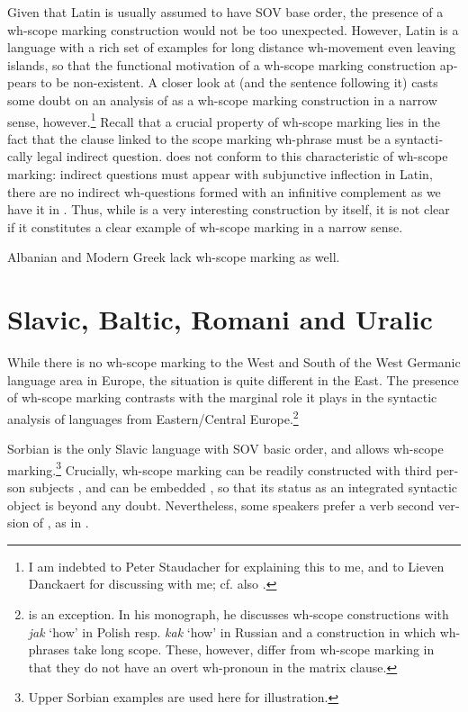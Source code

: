 \documentclass[output=paper,colorlinks,citecolor=brown]{langscibook}
\begin{document}
\begin{otherlanguage}{english}
\noindent Given that Latin is usually assumed to have SOV base order, the presence of a wh-scope marking construction would not be too unexpected. However, Latin is a language with a rich set of examples for long distance wh-movement even leaving islands, so that the functional motivation of a wh-scope marking construction appears to be non-existent. A closer look at  (and the sentence following it) casts some doubt on an analysis of  as a wh-scope marking construction in a narrow sense, however.\footnote{I am indebted to Peter Staudacher for explaining this to me, and to Lieven Danckaert for discussing  with me; cf. also \textcite[157]{Danckaert2012}.} Recall that a crucial property of wh-scope marking lies in the fact that the clause linked to the scope marking wh-phrase must be a syntactically legal indirect question.  does not conform to this characteristic of wh-scope marking: indirect questions must appear with subjunctive inflection in Latin, there are no indirect wh-questions formed with an infinitive complement as we have it in . Thus, while  is a very interesting construction by itself, it is not clear if it constitutes a clear example of wh-scope marking in a narrow sense.

Albanian and Modern Greek lack wh-scope marking as well. 

\section{Slavic, Baltic, Romani and Uralic} \label{section:slavic+}

While there is no wh-scope marking to the West and South of the West Germanic language area in Europe, the situation is quite different in the East. The presence of wh-scope marking contrasts with the marginal role it plays in the syntactic analysis of languages from Eastern/Central Europe.\footnote{\citet[Section 3.3]{Meyer2004} is an exception. In his monograph, he discusses wh-scope constructions with \textit{jak} ‘how’ in Polish resp. \textit{kak} ‘how’ in Russian and a construction in which wh-phrases take long scope. These, however, differ from wh-scope marking in that they do not have an overt wh-pronoun in the matrix clause.
}

Sorbian is the only Slavic language with SOV basic order, and allows wh-scope marking.\footnote{Upper Sorbian examples are used here for illustration.
} Crucially, wh-scope marking can be readily constructed with third person subjects , and can be embedded , so that its status as an integrated syntactic object is beyond any doubt. Nevertheless, some speakers prefer a verb second version of , as in .


\end{otherlanguage}
\end{document}
